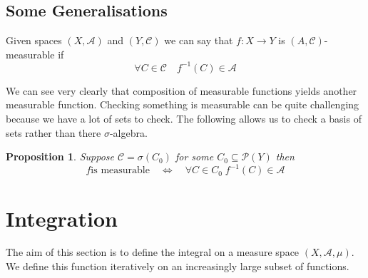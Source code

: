 \documentclass[11pt]{article}
\newcommand{\msrspc}{\ensuremath{(X,\mathcal{A},\mu)}}
\newenvironment{defin}
	{\begin{mdframed}[backgroundcolor=white, roundcorner=5pt, linewidth=1pt]}
	{\end{mdframed}}
\newcommand{\mdf}[1]{{\color{red} #1}}
\newtheorem{prop}[theorem]{Proposition}
\begin{document}
\subsection{Some Generalisations}
\begin{defin}
	Given spaces $(X, \mathcal{A})$ and $(Y, \mathcal{C})$ we can say that $f:X\to Y$ is \mdf{$(A, \mathcal{C})$-measurable} if
	\[
		\forall C \in \mathcal{C}\quad f^{-1}(C)\in \mathcal{A}
	\]	
\end{defin}
We can see very clearly that composition of measurable functions yields another measurable function.
Checking something is measurable can be quite challenging because we have a lot of sets to check.
The following allows us to check a basis of sets rather than there $\sigma$-algebra.
\begin{prop}
Suppose $\mathcal{C}=\sigma(C_0)$ for some $C_0\subseteq\mathcal{P}(Y)$ then
\[
	f \text{is measurable}\quad\iff\quad \forall C\in C_0\; f^{-1}(C)\in \mathcal{A}
\]
\end{prop}
\section{Integration}
The aim of this section is to define the integral on a measure space \msrspc.
We define this function iteratively on an increasingly large subset of functions.
\end{document}
